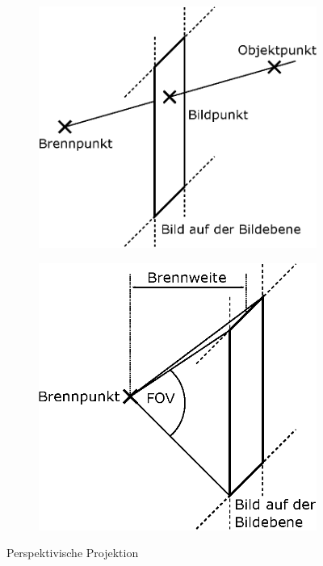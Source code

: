 \documentclass[ngerman,a4paper,parskip=half]{scrartcl}
\begin{document}
\begin{figure}
	\centering
	\begin{subfigure}{0.4\textwidth}
		\includegraphics[width=\textwidth]{includes/perspective}
	\end{subfigure}
	\hfill
	\begin{subfigure}{0.4\textwidth}
		\includegraphics[width=\textwidth]{includes/perspective2}
	\end{subfigure}
	\caption{Perspektivische Projektion}
	\label{fig:perspective}
\end{figure}
\end{document}
